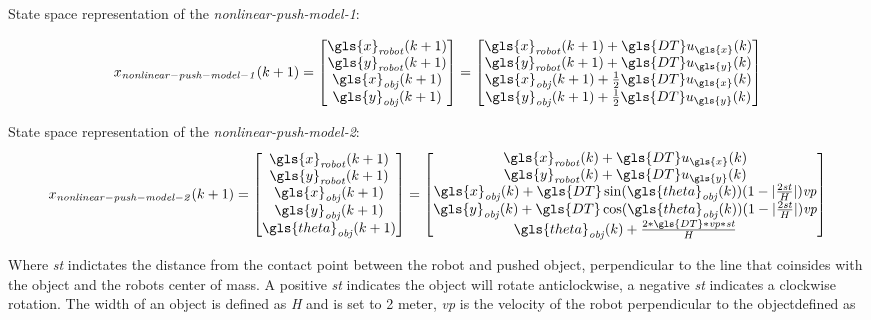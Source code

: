 State space representation of the \textit{nonlinear-push-model-1}:\bs

\begin{equation}
x_{\mathit{nonlinear-push-model-1}}(k+1)=
\begin{bmatrix}
\gls{x}_{\mathit{robot}}(k+1)\\
\gls{y}_{\mathit{robot}}(k+1)\\
\gls{x}_{\mathit{obj}}(k+1)\\
\gls{y}_{\mathit{obj}}(k+1)
\end{bmatrix}
=
\begin{bmatrix}
\gls{x}_{\mathit{robot}}(k+1) + \gls{DT} u_{\gls{x}}(k)\\
\gls{y}_{\mathit{robot}}(k+1) + \gls{DT} u_{\gls{y}}(k)\\
\gls{x}_{\mathit{obj}}(k+1) + \frac{1}{2} \gls{DT} u_{\gls{x}}(k)\\
\gls{y}_{\mathit{obj}}(k+1) + \frac{1}{2} \gls{DT} u_{\gls{y}}(k)
\end{bmatrix}
\label{eq:nonlinear-push-model-1}
\end{equation}


State space representation of the \textit{nonlinear-push-model-2}:\bs
\begin{equation}
x_{\mathit{nonlinear-push-model-2}}(k+1)=
\begin{bmatrix}
\gls{x}_{\mathit{robot}}(k+1)\\
\gls{y}_{\mathit{robot}}(k+1)\\
\gls{x}_{\mathit{obj}}(k+1)\\
\gls{y}_{\mathit{obj}}(k+1)\\
\gls{theta}_{\mathit{obj}}(k+1)
\end{bmatrix}
=
\begin{bmatrix}
\gls{x}_{\mathit{robot}}(k) + \gls{DT} u_{\gls{x}}(k)\\
\gls{y}_{\mathit{robot}}(k) + \gls{DT} u_{\gls{y}}(k)\\
\gls{x}_{\mathit{obj}}(k) + \gls{DT}\sin(\gls{theta}_{\mathit{obj}}(k)) (1-|\frac{2\mathit{st}}{H}|)\mathit{vp}\\
\gls{y}_{\mathit{obj}}(k) + \gls{DT}\cos(\gls{theta}_{\mathit{obj}}(k)) (1-|\frac{2\mathit{st}}{H}|)\mathit{vp}\\
\gls{theta}_{\mathit{obj}}(k) + \frac{2*\gls{DT}*\mathit{vp}*\mathit{st}}{H}
\end{bmatrix}
\label{eq:nonlinear-push-model-2}
\end{equation}

Where \textit{st} indictates the distance from the contact point between the robot and pushed object, perpendicular to the line that coinsides with the object and the robots center of mass. A positive \textit{st} indicates the object will rotate anticlockwise, a negative \textit{st} indicates a clockwise rotation. The width of an object is defined as \textit{H} and is set to 2 meter, \textit{vp} is the velocity of the robot perpendicular to the objectdefined as

